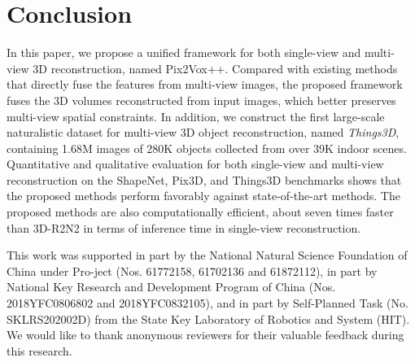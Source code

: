 \documentclass[twocolumn]{svjour3}
\begin{document}
\section{Conclusion}

In this paper, we propose a unified framework for both single-view and multi-view 3D reconstruction, named Pix2Vox++.
Compared with existing methods that directly fuse the features from multi-view images, the proposed framework fuses the 3D volumes reconstructed from input images, which better preserves multi-view spatial constraints.
In addition, we construct the first large-scale naturalistic dataset for multi-view 3D object reconstruction, named {\it Things3D}, containing 1.68M images of 280K objects collected from over 39K indoor scenes.
Quantitative and qualitative evaluation for both single-view and multi-view reconstruction on the ShapeNet, Pix3D, and Things3D benchmarks shows that the proposed methods perform favorably against state-of-the-art methods.
The proposed methods are also computationally efficient, about seven times faster than 3D-R2N2 in terms of inference time in single-view reconstruction.

\begin{acknowledgements}
This work was supported in part by the National Natural Science Foundation of China under Pro-ject (Nos. 61772158, 61702136 and 61872112), in part by National Key Research and Development Program of China (Nos. 2018YFC0806802 and 2018YFC0832105), and in part by Self-Planned Task (No. SKLRS202002D) from the State Key Laboratory of Robotics and System (HIT).
We would like to thank anonymous reviewers for their valuable feedback during this research.
\end{acknowledgements}



          
\end{document}
